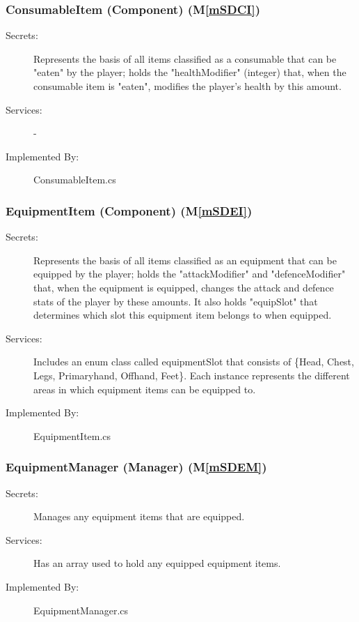 \documentclass[12pt, titlepage]{article}
\newcommand{\mref}[1]{M\ref{#1}}
\begin{document}
\subsubsection{ConsumableItem (Component) (\mref{mSDCI})}

\begin{description}
\item[Secrets:] Represents the basis of all items classified as a consumable that can be "eaten" by the player; holds the "healthModifier" (integer) that, when the consumable item is "eaten", modifies the player's health by this amount.
\item[Services:] -
\item[Implemented By:] ConsumableItem.cs
\end{description}

\subsubsection{EquipmentItem (Component) (\mref{mSDEI})}

\begin{description}
\item[Secrets:] Represents the basis of all items classified as an equipment that can be equipped by the player; holds the "attackModifier" and "defenceModifier" that, when the equipment is equipped, changes the attack and defence stats of the player by these amounts. It also holds "equipSlot" that determines which slot this equipment item belongs to when equipped.
\item[Services:] Includes an enum class called equipmentSlot that consists of \{Head, Chest, Legs, Primaryhand, Offhand, Feet\}. Each instance represents the different areas in which equipment items can be equipped to.
\item[Implemented By:] EquipmentItem.cs
\end{description}

\subsubsection{EquipmentManager (Manager) (\mref{mSDEM})}

\begin{description}
\item[Secrets:] Manages any equipment items that are equipped. 
\item[Services:] Has an array used to hold any equipped equipment items.
\item[Implemented By:] EquipmentManager.cs
\end{description}
\end{document}

